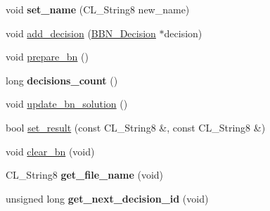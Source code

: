 \begin{DoxyCompactItemize}
\item 
\hypertarget{classBBN__Plot_a2f304f12d5ecabe5cbad5fb5607abdc7}{
void {\bfseries set\_\-name} (CL\_\-String8 new\_\-name)}
\label{classBBN__Plot_a2f304f12d5ecabe5cbad5fb5607abdc7}

\item 
void \hyperlink{classBBN__Plot_a7d7efcce2bd7fa7599f2bf6db57b8bdc}{add\_\-decision} (\hyperlink{classBBN__Decision}{BBN\_\-Decision} $\ast$decision)
\item 
void \hyperlink{classBBN__Plot_acc89676366edd3b07bfb9ec6d4bb61b5}{prepare\_\-bn} ()
\item 
\hypertarget{classBBN__Plot_a10c12f29c80dc8c61cf2cdd19cf15fdf}{
long {\bfseries decisions\_\-count} ()}
\label{classBBN__Plot_a10c12f29c80dc8c61cf2cdd19cf15fdf}

\item 
void \hyperlink{classBBN__Plot_a452d2d4a9b15217481ef83b781903627}{update\_\-bn\_\-solution} ()
\item 
bool \hyperlink{classBBN__Plot_a9b06ca52231b165a1fddad2b92cef7e2}{set\_\-result} (const CL\_\-String8 \&, const CL\_\-String8 \&)
\item 
void \hyperlink{classBBN__Plot_a04269d854d91d36d29f4297915f16e84}{clear\_\-bn} (void)
\item 
\hypertarget{classBBN__Plot_a0a4a470e60478bede023216319455c6d}{
CL\_\-String8 {\bfseries get\_\-file\_\-name} (void)}
\label{classBBN__Plot_a0a4a470e60478bede023216319455c6d}

\item 
\hypertarget{classBBN__Plot_aa711d9880c1f8cf8417210686a0e14d9}{
unsigned long {\bfseries get\_\-next\_\-decision\_\-id} (void)}
\label{classBBN__Plot_aa711d9880c1f8cf8417210686a0e14d9}

\end{DoxyCompactItemize}


